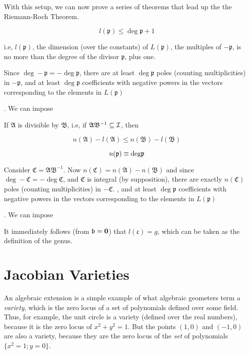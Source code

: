 With this setup, we can now prove a series of theorems that lead up
the the Riemann-Roch Theorem.

\theorem

$$l(\mathfrak{p}) \leq \deg \mathfrak{p} +1$$

i.e, $l(\mathfrak{p})$, the dimension (over the constants) of
$L(\mathfrak{p})$, the multiples of $-\mathfrak{p}$, is no more than
the degree of the divisor $\mathfrak{p}$, plus one.

\proof

Since $\deg -\mathfrak{p} = - \deg \mathfrak{p}$, there are at least
$\deg \mathfrak{p}$ poles (counting multiplicities) in
$-\mathfrak{p}$, and at least $\deg \mathfrak{p}$
coefficients with negative powers in the vectors corresponding
to the elements in $L(\mathfrak{p})$

.  We can impose

\endtheorem

\theorem

If $\mathfrak{A}$ is divisible by $\mathfrak{B}$, i.e, if
$\mathfrak{A}\mathfrak{B}^{-1} \subseteq {\cal I}$, then

$$n(\mathfrak{A}) - l(\mathfrak{A}) \leq n(\mathfrak{B}) - l(\mathfrak{B}) $$

$$n(\mathfrak{p}) \equiv {\rm deg} \mathfrak{p}$$

\proof

Consider $\mathfrak{C} = \mathfrak{A}\mathfrak{B}^{-1}$.
Now $n(\mathfrak{C}) = n(\mathfrak{A}) - n(\mathfrak{B})$ and since
$\deg -\mathfrak{C} = - \deg \mathfrak{C}$, and
$\mathfrak{C}$ is integral (by supposition),
there are exactly
$n(\mathfrak{C})$ poles (counting multiplicities) in $-\mathfrak{C}$.
, and at least $\deg \mathfrak{p}$
coefficients with negative powers in the vectors corresponding
to the elements in $L(\mathfrak{p})$

.  We can impose

\endtheorem

It immediately follows (from $\mathfrak{b}={\bf 0}$) that
$l(\mathfrak{c})=g$, which can be taken as the definition of the
genus.



\section{Jacobian Varieties}

An algebraic extension is a simple example of what algebraic geometers
term a {\it variety}, which is the zero locus of a set of polynomials
defined over some field.  Thus, for example, the unit circle is a
variety (defined over the real numbers), because it is the zero locus
of $x^2+y^2=1$.  But the points $(1,0)$ and $(-1,0)$ are also a
variety, because they are the zero locus of the {\it set} of
polynomials $\{x^2=1; y=0\}$.

